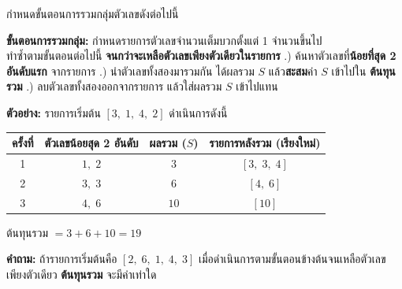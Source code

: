 \question กำหนดขั้นตอนการรวมกลุ่มตัวเลขดังต่อไปนี้

\begin{pseudocode}
\textbf{ขั้นตอนการรวมกลุ่ม:} กำหนดรายการตัวเลขจำนวนเต็มบวกตั้งแต่ 1 จำนวนขึ้นไป \\
ทำซ้ำตามขั้นตอนต่อไปนี้ \textbf{จนกว่าจะเหลือตัวเลขเพียงตัวเดียวในรายการ}
\newline
.) ค้นหาตัวเลขที่\textbf{น้อยที่สุด 2 อันดับแรก} จากรายการ
\newline
.) นำตัวเลขทั้งสองมารวมกัน ได้ผลรวม $S$ แล้ว\textbf{สะสม}ค่า $S$ เข้าไปใน \textbf{ต้นทุนรวม}
\newline
.) ลบตัวเลขทั้งสองออกจากรายการ แล้วใส่ผลรวม $S$ เข้าไปแทน
\end{pseudocode}

\textbf{ตัวอย่าง:} รายการเริ่มต้น $[3,\; 1,\; 4,\; 2]$ ดำเนินการดังนี้

\begin{center}
\begin{tabular}{c|c|c|c}
\textbf{ครั้งที่} & \textbf{ตัวเลขน้อยสุด 2 อันดับ} & \textbf{ผลรวม ($S$)} & \textbf{รายการหลังรวม (เรียงใหม่)} \\
\hline
1 & $1,\; 2$ & $3$ & $[3,\; 3,\; 4]$ \\
2 & $3,\; 3$ & $6$ & $[4,\; 6]$ \\
3 & $4,\; 6$ & $10$ & $[10]$ \\
\end{tabular}
\end{center}

ต้นทุนรวม $= 3 + 6 + 10 = 19$

\textbf{คำถาม:} ถ้ารายการเริ่มต้นคือ $[2,\; 6,\; 1,\; 4,\; 3]$ เมื่อดำเนินการตามขั้นตอนข้างต้นจนเหลือตัวเลขเพียงตัวเดียว \textbf{ต้นทุนรวม} จะมีค่าเท่าใด


